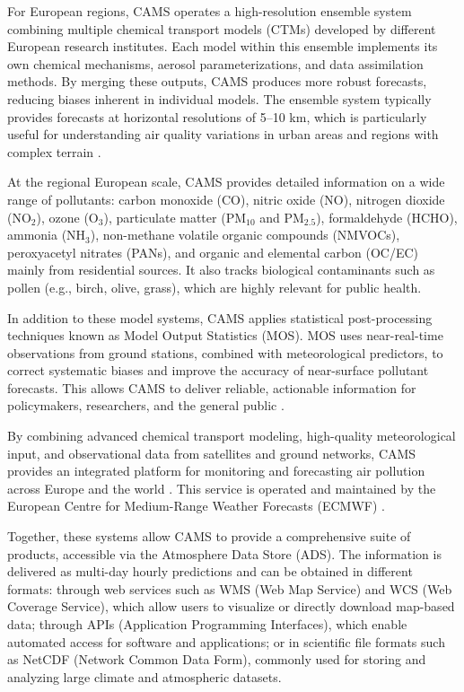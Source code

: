For European regions, CAMS operates a high-resolution ensemble system combining multiple chemical transport models (CTMs) developed by different European research institutes. Each model within this ensemble implements its own chemical mechanisms, aerosol parameterizations, and data assimilation methods. By merging these outputs, CAMS produces more robust forecasts, reducing biases inherent in individual models. The ensemble system typically provides forecasts at horizontal resolutions of 5–10 km, which is particularly useful for understanding air quality variations in urban areas and regions with complex terrain \cite{ecmwfCAMSRegional}.  

At the regional European scale, CAMS provides detailed information on a wide range of pollutants: carbon monoxide (CO), nitric oxide (NO), nitrogen dioxide (NO$_2$), ozone (O$_3$), particulate matter (PM$_{10}$ and PM$_{2.5}$), formaldehyde (HCHO), ammonia (NH$_3$), non-methane volatile organic compounds (NMVOCs), peroxyacetyl nitrates (PANs), and organic and elemental carbon (OC/EC) mainly from residential sources. It also tracks biological contaminants such as pollen (e.g., birch, olive, grass), which are highly relevant for public health.

In addition to these model systems, CAMS applies statistical post-processing techniques known as Model Output Statistics (MOS). 
MOS uses near-real-time observations from ground stations, combined with meteorological predictors, to correct systematic biases and improve the accuracy of near-surface pollutant forecasts. 
This allows CAMS to deliver reliable, actionable information for policymakers, researchers, and the general public \cite{copernicusModelOutput}.

By combining advanced chemical transport modeling, high-quality meteorological input, and observational data from satellites and ground networks, CAMS provides an integrated platform for monitoring and forecasting air pollution across Europe and the world \cite{copernicusCopernicus}. 
This service is operated and maintained by the European Centre for Medium-Range Weather Forecasts (ECMWF) \cite{ecmwfECMWF}. 

Together, these systems allow CAMS to provide a comprehensive suite of products, accessible via the Atmosphere Data Store (ADS). The information is delivered as multi-day hourly predictions and can be obtained in different formats: through web services such as WMS (Web Map Service) and WCS (Web Coverage Service), which allow users to visualize or directly download map-based data; through APIs (Application Programming Interfaces), which enable automated access for software and applications; or in scientific file formats such as NetCDF (Network Common Data Form), commonly used for storing and analyzing large climate and atmospheric datasets.


